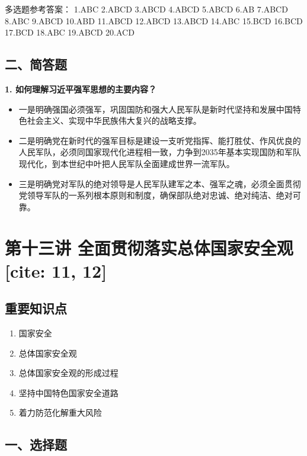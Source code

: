 \documentclass[a4paper,11pt]{ctexart}
\begin{document}
\begin{answerbox}
多选题参考答案：
1.ABC \quad 2.ABCD \quad 3.ABCD \quad 4.ABCD \quad 5.ABCD \quad 6.AB \quad 7.ABCD \quad 8.ABC \quad 9.ABCD \quad 10.ABD \quad 11.ABCD \quad 12.ABCD \quad 13.ABCD \quad 14.ABC \quad 15.BCD \quad 16.BCD \quad 17.BCD \quad 18.ABC \quad 19.ABCD \quad 20.ACD
\end{answerbox}

\subsection{二、简答题}
\textbf{1. 如何理解习近平强军思想的主要内容？}
\begin{itemize}
    \item 一是明确强国必须强军，巩固国防和强大人民军队是新时代坚持和发展中国特色社会主义、实现中华民族伟大复兴的战略支撑。
    \item 二是明确党在新时代的强军目标是建设一支听党指挥、能打胜仗、作风优良的人民军队，必须同国家现代化进程相一致，力争到2035年基本实现国防和军队现代化，到本世纪中叶把人民军队全面建成世界一流军队。
    \item 三是明确党对军队的绝对领导是人民军队建军之本、强军之魂，必须全面贯彻党领导军队的一系列根本原则和制度，确保部队绝对忠诚、绝对纯洁、绝对可靠。
\end{itemize}

\newpage

\section{第十三讲 全面贯彻落实总体国家安全观 [cite: 11, 12]}

\subsection{重要知识点}
\begin{enumerate}
    \item 国家安全
    \item 总体国家安全观
    \item 总体国家安全观的形成过程
    \item 坚持中国特色国家安全道路
    \item 着力防范化解重大风险
\end{enumerate}

\subsection{一、选择题}
\end{document}
